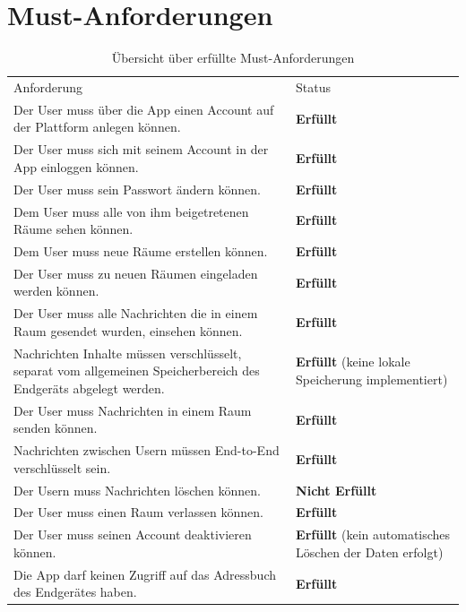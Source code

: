     \newpage
    \section{Must-Anforderungen}\label{sec:must-anforderungen}
    \begin{table}[h]
        \centering
        \begin{tabular}{p{}|p{}}
            Anforderung & Status\\
            \cline{1-2}
            Der User muss über die App einen Account auf der Plattform anlegen können.
            &  \textbf{Erfüllt} \\
            \cline{1-2}
            Der User muss sich mit seinem Account in der App einloggen können. &  \textbf{Erfüllt} \\
            \cline{1-2}
            Der User muss sein Passwort ändern können. & \textbf{Erfüllt}  \\
            \cline{1-2}
            Dem User muss alle von ihm beigetretenen Räume sehen können. &  \textbf{Erfüllt} \\
            \cline{1-2}
            Dem User muss neue Räume erstellen können. & \textbf{Erfüllt} \\
            \cline{1-2}
            Der User muss zu neuen Räumen eingeladen werden können. & \textbf{Erfüllt} \\
            \cline{1-2}
            Der User muss alle Nachrichten die in einem Raum gesendet wurden, einsehen können. & \textbf{Erfüllt} \\
            \cline{1-2}
            Nachrichten Inhalte müssen verschlüsselt, separat vom allgemeinen Speicherbereich des Endgeräts abgelegt werden. & \textbf{Erfüllt} (keine lokale Speicherung implementiert) \\
            \cline{1-2}
            Der User muss Nachrichten in einem Raum senden können. & \textbf{Erfüllt} \\
            \cline{1-2}
            Nachrichten zwischen Usern müssen End-to-End verschlüsselt sein. & \textbf{Erfüllt} \\
            \cline{1-2}
            Der Usern muss Nachrichten löschen können. & \textbf{Nicht Erfüllt} \\
            \cline{1-2}
            Der User muss einen Raum verlassen können. & \textbf{Erfüllt} \\
            \cline{1-2}
            Der User muss seinen Account deaktivieren können. & \textbf{Erfüllt} (kein automatisches Löschen der Daten erfolgt)\\
            \cline{1-2}
            Die App darf keinen Zugriff auf das Adressbuch des Endgerätes haben. & \textbf{Erfüllt}
        \end{tabular}
        \caption{Übersicht über erfüllte Must-Anforderungen}
        \label{tab:erfüllte-must-anforderungen}
    \end{table}

